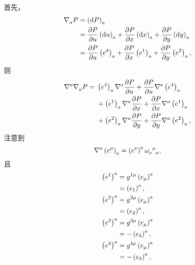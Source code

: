 \begin{xiti}
	\begin{zm}
		首先，
		\begin{equation*}
			\begin{split}
				\tensor{\nabla}{_a} P &= \tensor{\left( \dd{P} \right)}{_a}\\
				&= \pdv{P}{u} \tensor{\left( \dd{u} \right)}{_a} + \pdv{P}{x} \tensor{\left( \dd{x} \right)}{_a} + \pdv{P}{y} \tensor{\left( \dd{y} \right)}{_a}\\
				&= \pdv{P}{u} \tensor{\left( e^4 \right)}{_a} + \pdv{P}{x} \tensor{\left( e^1 \right)}{_a} + \pdv{P}{y} \tensor{\left( e^2 \right)}{_a},
			\end{split}
		\end{equation*}
		则
		\begin{equation*}
			\begin{split}
				\tensor{\nabla}{^a} \tensor{\nabla}{_a} P ={} & \tensor{\left( e^4 \right)}{_a} \tensor{\nabla}{^a} \pdv{P}{u} + \pdv{P}{u} \tensor{\nabla}{^a} \tensor{\left( e^4 \right)}{_a}\\
				&{}+ \tensor{\left( e^1 \right)}{_a} \tensor{\nabla}{^a} \pdv{P}{x} + \pdv{P}{x} \tensor{\nabla}{^a} \tensor{\left( e^1 \right)}{_a}\\
				&{}+ \tensor{\left( e^2 \right)}{_a} \tensor{\nabla}{^a} \pdv{P}{y} + \pdv{P}{y} \tensor{\nabla}{^a} \tensor{\left( e^2 \right)}{_a},
			\end{split}
		\end{equation*}
		注意到
		\begin{equation*}
			\tensor{\nabla}{^a} \tensor{\left( e^\mu \right)}{_a} = \tensor{\left( e^\nu \right)}{^a} \tensor{\omega}{_\nu^\mu_a},
		\end{equation*}
		且
		\begin{align*}
			\tensor{\left( e^1 \right)}{^a} &= \tensor{g}{^1^\mu} \tensor{\left( e_\mu \right)}{^a}\\
			&= \tensor{\left( e_1 \right)}{^a},\\
			\tensor{\left( e^2 \right)}{^a} &= \tensor{g}{^2^\mu} \tensor{\left( e_\mu \right)}{^a}\\
			&= \tensor{\left( e_2 \right)}{^a},\\
			\tensor{\left( e^3 \right)}{^a} &= \tensor{g}{^3^\mu} \tensor{\left( e_\mu \right)}{^a}\\
			&= -\tensor{\left( e_4 \right)}{^a},\\
			\tensor{\left( e^4 \right)}{^a} &= \tensor{g}{^4^\mu} \tensor{\left( e_\mu \right)}{^a}\\
			&= - \tensor{\left( e_3 \right)}{^a},

\end{align*}
\end{zm}
\end{xiti}
